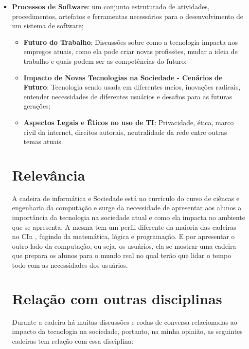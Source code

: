 \documentclass[10pt]{article}
\begin{document}
\begin{itemize}
    \item \textbf{Processos de Software}: um conjunto estruturado de atividades, procedimentos, artefatos e ferramentas necessários para o desenvolvimento de um sistema de software;\citep{ProcessosSoftware}

\begin{itemize}
    \item \textbf{Futuro do Trabalho}: Discussões sobre como a
tecnologia impacta nos empregos atuais, como ela pode criar novas profissões, mudar a ideia de trabalho e quais podem ser as competências do futuro;
        
    \item \textbf{Impacto de Novas Tecnologias na Sociedade - Cenários de Futuro}: Tecnologia sendo usada em diferentes meios, inovações radicais, entender necessidades de diferentes usuários e desafios para as futuras gerações;
    
    \item \textbf{Aspectos Legais e Éticos no uso de TI}: Privacidade, ética, marco civil da internet, direitos autorais, neutralidade da rede entre outras temas atuais.
    
\end{itemize}

\section{Relevância}
A cadeira de informática e Sociedade está no currículo do curso de ciêncas
e engenharia da computação e surge da necessidade de apresentar aos alunos a importância da tecnologia na sociedade atual e como ela impacta no ambiente que se apresenta. A mesma tem um perfil diferente da maioria das cadeiras no CIn
, fugindo da matemática, lógica e programação. E por apresentar o outro lado da computação, ou seja, os usuários, ela se mostrar uma cadeira que prepara os alunos para o mundo real no qual terão que lidar o tempo todo com as necessidades dos usuários.

\section{Relação com outras disciplinas}
Durante a cadeira há muitas discussões e rodas de conversa relacionadas ao impacto da tecnologia na sociedade, portanto, na minha opinião, as seguintes cadeiras tem relação com essa disciplina:


\end{itemize}
\end{document}
